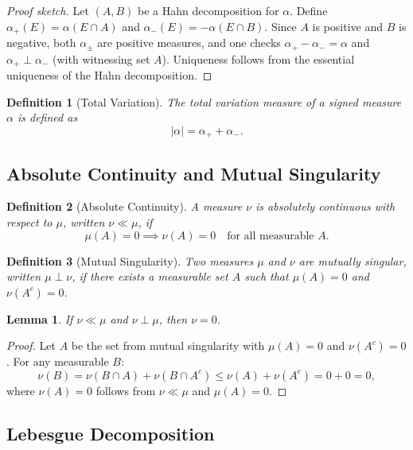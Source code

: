 \documentclass[11pt]{article}
\newtheorem{lemma}{Lemma}
\newtheorem{definition}{Definition}
\begin{document}
\begin{proof}[Proof sketch]
Let $(A, B)$ be a Hahn decomposition for $\alpha$. Define $\alpha_+(E) = \alpha(E \cap A)$ and $\alpha_-(E) = -\alpha(E \cap B)$. Since $A$ is positive and $B$ is negative, both $\alpha_\pm$ are positive measures, and one checks $\alpha_+ - \alpha_- = \alpha$ and $\alpha_+ \perp \alpha_-$ (with witnessing set $A$). Uniqueness follows from the essential uniqueness of the Hahn decomposition.
\end{proof}

\begin{definition}[Total Variation]
The \emph{total variation measure} of a signed measure $\alpha$ is defined as
\[
|\alpha| = \alpha_+ + \alpha_-.
\]
\end{definition}

\subsection{Absolute Continuity and Mutual Singularity}

\begin{definition}[Absolute Continuity]
A measure $\nu$ is \emph{absolutely continuous} with respect to $\mu$, written $\nu \ll \mu$, if
\[
\mu(A) = 0 \implies \nu(A) = 0 \quad \text{for all measurable } A.
\]
\end{definition}

\begin{definition}[Mutual Singularity]
Two measures $\mu$ and $\nu$ are \emph{mutually singular}, written $\mu \perp \nu$, if there exists a measurable set $A$ such that $\mu(A) = 0$ and $\nu(A^c) = 0$.
\end{definition}

\begin{lemma}
If $\nu \ll \mu$ and $\nu \perp \mu$, then $\nu = 0$.
\end{lemma}

\begin{proof}
Let $A$ be the set from mutual singularity with $\mu(A) = 0$ and $\nu(A^c) = 0$. For any measurable $B$:
\[
\nu(B) = \nu(B \cap A) + \nu(B \cap A^c) \leq \nu(A) + \nu(A^c) = 0 + 0 = 0,
\]
where $\nu(A) = 0$ follows from $\nu \ll \mu$ and $\mu(A) = 0$.
\end{proof}

\subsection{Lebesgue Decomposition}
\end{document}
